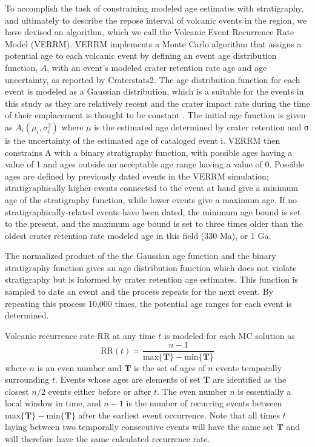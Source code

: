 \documentclass[12pt,letter]{article}
\begin{document}
To accomplish the task of constraining modeled age estimates with stratigraphy, and ultimately to describe the repose interval of volcanic events in the region, we have devised an algorithm, which we call the Volcanic Event Recurrence Rate Model (VERRM). VERRM implements a Monte Carlo algorithm that assigns a potential age to each volcanic event by defining an event age distribution function, $A$, with an event's modeled crater retention rate age and age uncertainty, as reported by Craterstats2. The age distribution function for each event is modeled as a Gaussian distribution, which is a suitable for the events in this study as they are relatively recent and the crater impact rate during the time of their emplacement is thought to be constant \citep{vaucher2009volcanic}. The initial age function is given as $A_i(\mu_i,\sigma_i^2)$ where $\mu$ is the estimated age determined by crater retention and σ is the uncertainty of the estimated age of cataloged event i. VERRM then constrains A with a binary stratigraphy function, with possible ages having a value of 1 and ages outside an acceptable age range having a value of 0. Possible ages are defined by previously dated events in the VERRM simulation; stratigraphically higher events connected to the event at hand give a minimum age of the stratigraphy function, while lower events give a maximum age. If no stratigraphically-related events have been dated, the minimum age bound is set to the present, and the maximum age bound is set to three times older than the oldest crater retention rate modeled age in this field (330 Ma), or 1 Ga.

The normalized product of the the Gaussian age function and the binary stratigraphy function gives an age distribution function which does not violate stratigraphy but is informed by crater retention age estimates. This function is sampled to date an event and the process repeats for the next event. By repeating this process 10,000 times, the potential age ranges for each event is determined.

Volcanic recurrence rate RR at any time $t$ is modeled for each MC solution as
\begin{equation}
\text{RR}(t) = \frac{n-1}{\text{max}\{\mathbf{T}\} - \text{min}\{\mathbf{T}\}}
\label{eq_RR}
\end{equation}
where $n$ is an even number and $\mathbf{T}$ is the set of ages of $n$ events temporally surrounding $t$. Events whose ages are elements of set $\mathbf{T}$ are identified as the closest $n/2$ events either before or after $t$. The even number $n$ is essentially a local window in time, and $n-1$ is the number of recurring events between $\text{max}\{\mathbf{T}\}-\text{min}\{\mathbf{T}\}$ after the earliest event occurrence. Note that all times $t$ laying between two temporally consecutive events will have the same set $\mathbf{T}$ and will therefore have the same calculated recurrence rate.
\end{document}
